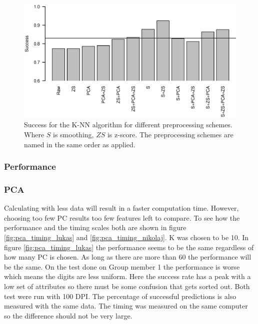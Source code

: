 \begin{figure}[H]
\includegraphics[width = 1 \textwidth]{graphics/knn_zscore_3}
\caption{Success for the K-NN algorithm for different preprocessing schemes.
Where $S$ is smoothing, $ZS$ is z-score.
The preprocessing schemes are named in the same order as applied.}
\end{figure}



\subsubsection{Performance}

\begin{figure}[H]
\centering
{}
\end{figure}

\begin{figure}[H]
\centering
{}
\end{figure}




\subsubsection{PCA}

Calculating with less data will result in a faster computation time.
However, choosing too few PC results too few features left to compare.
To see how the performance and the timing scales both are shown in figure \ref{fig:pca_timing_lukas} and \ref{fig:pca_timing_nikolaj}. K was chosen to be 10.
In figure \ref{fig:pca_timing_lukas} the performance seems to be the same regardless of how many PC is chosen. As long as there are more than 60 the performance will be the same.
On the test done on Group member 1 the performance is worse which means the digits are less uniform. 
Here the success rate has a peak with a low set of attributes so there must be some confusion that gets sorted out. 
Both test were run with 100 DPI. The percentage of successful predictions is also measured with the same data.
The timing was measured on the same computer so the difference should not be very large. 

